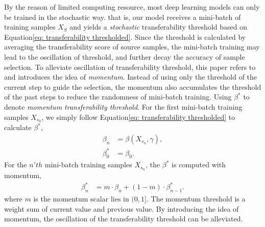 {By the reason of limited computing resource, most deep learning models can only be trained in the stochastic way. that is, our model receives a mini-batch of training samples $X_S$ and yields a \textit{stochastic} transferability threshold based on Equation\ref{eq: transferability thresholded}. 
Since the threshold is calculated by averaging the transferability score of source samples, the mini-batch training may lead to the oscillation of threshold, and further decay the accuracy of sample selection. 
To alleviate oscillation of transferability threshold, this paper refers to \cite{MomentumSGD} and introduces the idea of \textit{momentum}. 
Instead of using only the threshold of the current step to guide the selection, the momentum also accumulates the threshold of the past steps to reduce the randomness of mini-batch training.  
Using $\beta^*$ to denote \textit{momentum transferability threshold}.
For the first mini-batch training samples $X_{s_0}$, we simply follow Equation\ref{eq: transferability thresholded} to calculate $\beta^*$, 
\begin{equation}
    \label{eq: momentum transferability baseline}
    \begin{split}
        \beta_n &= \beta(X_{s_n},\gamma), \\
        \beta^*_0 &= \beta_0.
    \end{split}
\end{equation}
For the $n'th$ mini-batch training samples $X_{s_n}$, the $\beta^*$ is computed with momentum,
\begin{equation}
    \label{eq: momentum transferability baseline}
    \begin{split}
        \beta^*_n &= m \cdot \beta_n + (1-m) \cdot \beta^*_{n-1} .
    \end{split}
\end{equation}
where $m$ is the momentum scalar lies in $(0,1]$. The momentum threshold is a weight sum of current value and previous value. 
By introducing the idea of momentum, the oscillation of the transferability threshold can be alleviated.

}
